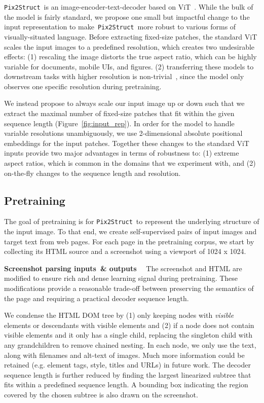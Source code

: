 \documentclass{article} \usepackage[accepted]{icml2023}
\newcommand\ourmodel{{\texttt{Pix2Struct}}}
\begin{document}
\ourmodel~is an image-encoder-text-decoder based on ViT~\citep{vit}. While the bulk of the model is fairly standard, we propose one small but impactful change to the input representation to make~\ourmodel~more robust to various forms of visually-situated language.
Before extracting fixed-size patches, the standard ViT scales the input images to a predefined resolution, which creates two undesirable effects: (1) rescaling the image distorts the true aspect ratio, which can be highly variable for documents, mobile UIs, and figures. (2) transferring these models to downstream tasks with higher resolution is non-trivial~\citep{train-test-resolution,simvlm}, since the model only observes one specific resolution during pretraining.

We instead propose to always scale our input image up or down such that we extract the maximal number of fixed-size patches that fit within the given sequence length (Figure~\ref{fig:input_rep}). In order for the model to handle variable resolutions unambiguously, we use 2-dimensional absolute positional embeddings for the input patches.
Together these changes to the standard ViT inputs provide two major advantages in terms of robustness to: (1) extreme aspect ratios, which is common in the domains that we experiment with, and (2) on-the-fly changes to the sequence length and resolution.

\subsection{Pretraining}
\label{sec:pretraining}
The goal of pretraining is for \ourmodel~to represent the underlying structure of the input image. To that end, we create self-supervised pairs of input images and target text from web pages. For each page in the pretraining corpus, we start by collecting its HTML source and a screenshot using a viewport of 1024 x 1024.

\textbf{Screenshot parsing inputs~\& outputs}~~
The screenshot and HTML are modified to ensure rich and dense learning signal during pretraining. These modifications provide a reasonable trade-off between preserving the semantics of the page and requiring a practical decoder sequence length.

We condense the HTML DOM tree by (1) only keeping nodes with \emph{visible} elements or descendants with visible elements and (2) if a node does not contain visible elements and it only has a single child, replacing the singleton child with any grandchildren to remove chained nesting. In each node, we only use the text, along with filenames and alt-text of images. Much more information could be retained (e.g. element tags, style, titles and URLs) in future work. The decoder sequence length is further reduced by finding the largest linearized subtree that fits within a predefined sequence length. A bounding box indicating the region covered by the chosen subtree is also drawn on the screenshot.
\end{document}
